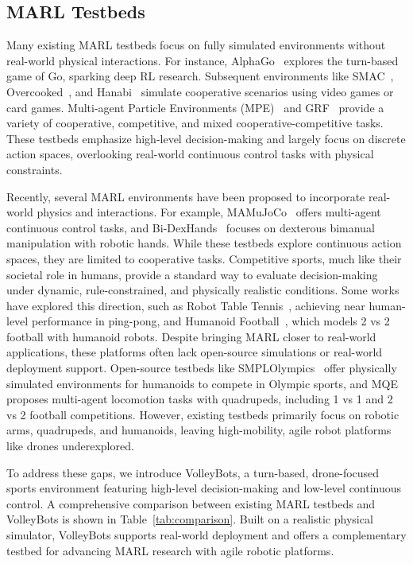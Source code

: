 \subsection{MARL Testbeds}
Many existing MARL testbeds focus on fully simulated environments without real-world physical interactions. For instance, AlphaGo~\cite{silver2016mastering} explores the turn-based game of Go, sparking deep RL research. Subsequent environments like SMAC~\cite{samvelyan2019starcraft,ellis2024smacv2}, Overcooked~\cite{carroll2019utility}, and Hanabi~\cite{bard2020hanabi} simulate cooperative scenarios using video games or card games. Multi-agent Particle Environments (MPE)~\cite{lowe2020multiagentactorcriticmixedcooperativecompetitive} and GRF~\cite{kurach2020google} provide a variety of cooperative, competitive, and mixed cooperative-competitive tasks. These testbeds emphasize high-level decision-making and largely focus on discrete action spaces, overlooking real-world continuous control tasks with physical constraints.

Recently, several MARL environments have been proposed to incorporate real-world physics and interactions. For example, MAMuJoCo~\cite{peng2021facmac} offers multi-agent continuous control tasks, and Bi-DexHands~\cite{chen2022humanlevelbimanualdexterousmanipulation} focuses on dexterous bimanual manipulation with robotic hands. While these testbeds explore continuous action spaces, they are limited to cooperative tasks. Competitive sports, much like their societal role in humans, provide a standard way to evaluate decision-making under dynamic, rule-constrained, and physically realistic conditions. Some works have explored this direction, such as Robot Table Tennis~\cite{d2024achieving}, achieving near human-level performance in ping-pong, and Humanoid Football~\cite{liu2022motor,haarnoja2024learning}, which models 2 vs 2 football with humanoid robots. Despite bringing MARL closer to real-world applications, these platforms often lack open-source simulations or real-world deployment support. Open-source testbeds like SMPLOlympics~\cite{luo2024smplolympicssportsenvironmentsphysically} offer physically simulated environments for humanoids to compete in Olympic sports, and MQE~\cite{xiong2024mqe} proposes multi-agent locomotion tasks with quadrupeds, including 1 vs 1 and 2 vs 2 football competitions.
However, existing testbeds primarily focus on robotic arms, quadrupeds, and humanoids, leaving high-mobility, agile robot platforms like drones underexplored.

To address these gaps, we introduce VolleyBots, a turn-based, drone-focused sports environment featuring high-level decision-making and low-level continuous control. A comprehensive comparison between existing MARL testbeds and VolleyBots is shown in Table~\ref{tab:comparison}. Built on a realistic physical simulator, VolleyBots supports real-world deployment and offers a complementary testbed for advancing MARL research with agile robotic platforms.

